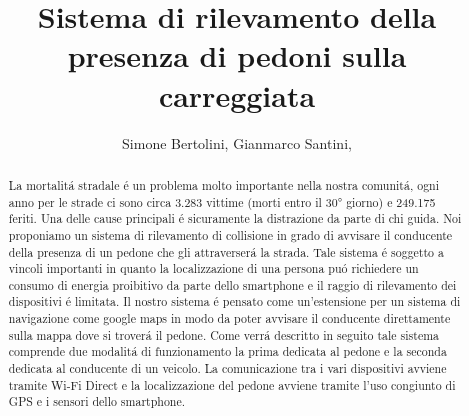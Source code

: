 \documentclass[conference]{IEEEtran}
\begin{document}
\title{Sistema di rilevamento della presenza di pedoni sulla carreggiata}

\author{
Simone Bertolini,
Gianmarco Santini,
\\
}




\maketitle

\begin{abstract}
La mortalit\'a stradale \'e un problema molto importante nella nostra comunit\'a, ogni anno per le strade ci sono circa 3.283 vittime (morti entro il 30° giorno) e 249.175 feriti. Una delle cause principali \'e sicuramente la distrazione da parte di chi guida. Noi proponiamo un sistema di rilevamento di collisione in grado di avvisare il conducente della presenza di un pedone che gli attraverser\'a la strada. Tale sistema \'e soggetto a vincoli importanti in quanto la localizzazione di una persona pu\'o richiedere un consumo di energia proibitivo da parte dello smartphone e il raggio di rilevamento dei dispositivi \'e limitata. Il nostro sistema \'e pensato come un'estensione per un sistema di navigazione come google maps in modo da poter avvisare il conducente direttamente sulla mappa dove si trover\'a il pedone. Come verr\'a descritto in seguito tale sistema comprende due modalit\'a di funzionamento la prima dedicata al pedone e la seconda dedicata al conducente di un veicolo. La comunicazione tra i vari dispositivi avviene tramite Wi-Fi Direct e la localizzazione del pedone avviene tramite l'uso congiunto di GPS e i sensori dello smartphone.

\end{abstract}
\end{document}
